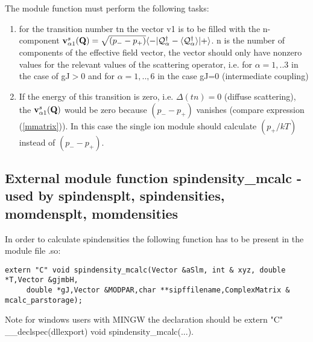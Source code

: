 The module function must perform the following tasks:
\begin{enumerate}
\item for the transition number tn the vector v1  is to be filled with the n-component 
 ${\mathbf v^s_{\alpha1}}(\mathbf Q)=
\sqrt{(p_--p_+)}
\langle -|\mathcal Q^{\dag}_{\alpha}-\langle \mathcal Q^{\dag}_{\alpha}\rangle|+\rangle$.
n is the number of components of the effective field vector, the vector
should only have nonzero values for the relevant values of
the scattering operator, i.e. for $\alpha=1,..3$ in the case of
gJ$>$0 and for $\alpha=1,..,6$ in the case gJ=0 (intermediate coupling)
\item
If the energy of this transition
is zero, i.e. $\Delta(tn)=0$ (diffuse scattering), 
the ${\mathbf v^s_{\alpha1}}(\mathbf Q)$ 
 would be zero because $(p_--p_+)$ vanishes (compare expression (\ref{mmatrix})).
In this case the single ion module should calculate $(p_+/kT)$ instead of $(p_--p_+)$.
\end{enumerate}

\subsection{External module function {\prg spindensity\_mcalc} -
used by {\prg spindensplt},
{\prg spindensities},
{\prg momdensplt},
{\prg momdensities}}

In order to calculate spindensities
the following function has to be
present in the module file {\prg *.so}:

\begin{verbatim}
extern "C" void spindensity_mcalc(Vector &aSlm, int & xyz, double *T,Vector &gjmbH,
     double *gJ,Vector &MODPAR,char **sipffilename,ComplexMatrix & mcalc_parstorage);
\end{verbatim}

Note for windows users with MINGW the declaration should be {\prg extern "C" \_\_declspec(dllexport) void %
spindensity\_mcalc(...)}.

